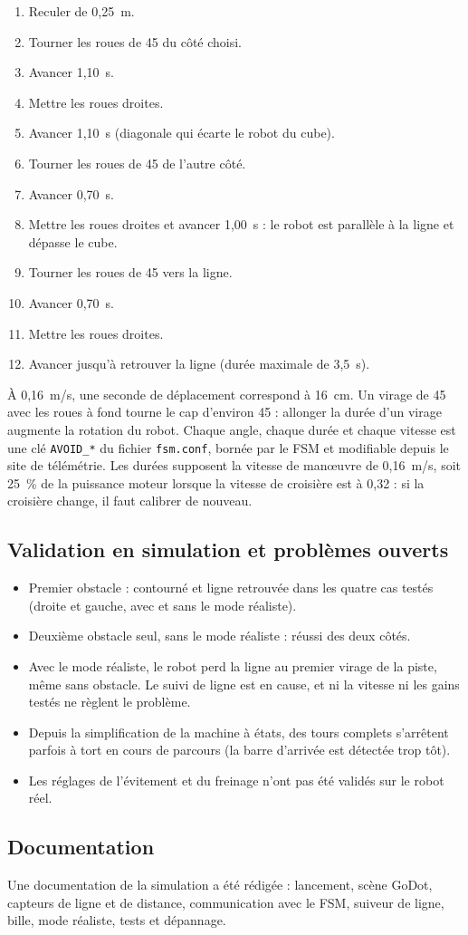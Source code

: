 \begin{enumerate}
    \item Reculer de 0,25~m.
    \item Tourner les roues de 45\degree{} du côté choisi.
    \item Avancer 1,10~s.
    \item Mettre les roues droites.
    \item Avancer 1,10~s (diagonale qui écarte le robot du cube).
    \item Tourner les roues de 45\degree{} de l'autre côté.
    \item Avancer 0,70~s.
    \item Mettre les roues droites et avancer 1,00~s : le robot est parallèle à la ligne et dépasse le cube.
    \item Tourner les roues de 45\degree{} vers la ligne.
    \item Avancer 0,70~s.
    \item Mettre les roues droites.
    \item Avancer jusqu'à retrouver la ligne (durée maximale de 3,5~s).
\end{enumerate}

À 0,16~m/s, une seconde de déplacement correspond à 16~cm.
Un virage de 45\degree{} avec les roues à fond tourne le cap d'environ 45\degree{} : allonger la durée d'un virage augmente la rotation du robot.
Chaque angle, chaque durée et chaque vitesse est une clé \texttt{AVOID\_*} du fichier \texttt{fsm.conf}, bornée par le FSM et modifiable depuis le site de télémétrie.
Les durées supposent la vitesse de manœuvre de 0,16~m/s, soit 25~\% de la puissance moteur lorsque la vitesse de croisière est à 0,32 : si la croisière change, il faut calibrer de nouveau.

\subsection{Validation en simulation et problèmes ouverts}
\begin{itemize}
    \item Premier obstacle : contourné et ligne retrouvée dans les quatre cas testés (droite et gauche, avec et sans le mode réaliste).
    \item Deuxième obstacle seul, sans le mode réaliste : réussi des deux côtés.
    \item Avec le mode réaliste, le robot perd la ligne au premier virage de la piste, même sans obstacle. Le suivi de ligne est en cause, et ni la vitesse ni les gains testés ne règlent le problème.
    \item Depuis la simplification de la machine à états, des tours complets s'arrêtent parfois à tort en cours de parcours (la barre d'arrivée est détectée trop tôt).
    \item Les réglages de l'évitement et du freinage n'ont pas été validés sur le robot réel.
\end{itemize}

\subsection{Documentation}
Une documentation de la simulation a été rédigée : lancement, scène GoDot, capteurs de ligne et de distance, communication avec le FSM, suiveur de ligne, bille, mode réaliste, tests et dépannage.
